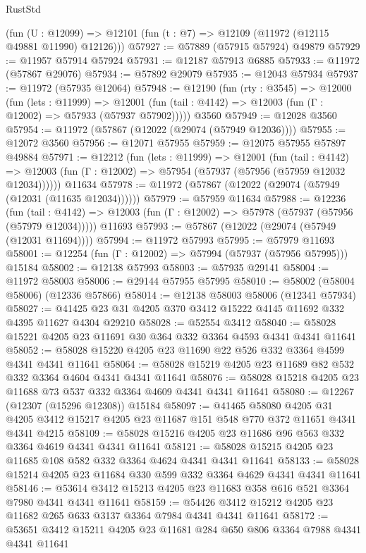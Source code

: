 \begin{lexlean}{RustStd}
\begin{coremodule}
    (fun (U : @12099) => @12101 (fun (t : @7) => @12109 (@11972 (@12115 @49881 @11990) @12126)))
@57927 := @57889 (@57915 @57924) @49879
@57929 := @11957 @57914 @57924
@57931 := @12187 @57913 @6885
@57933 := @11972 (@57867 @29076)
@57934 := @57892 @29079
@57935 := @12043 @57934
@57937 := @11972 (@57935 @12064)
@57948 := @12190
    (fun (rty : @3545) =>
    @12000
      (fun (lets : @11999) =>
      @12001 (fun (tail : @4142) => @12003 (fun (Γ : @12002) => @57933 (@57937 @57902)))))
    @3560
@57949 := @12028 @3560
@57954 := @11972 (@57867 (@12022 (@29074 (@57949 @12036))))
@57955 := @12072 @3560
@57956 := @12071 @57955
@57959 := @12075 @57955 @57897 @49884
@57971 := @12212
    (fun (lets : @11999) =>
    @12001
      (fun (tail : @4142) =>
      @12003 (fun (Γ : @12002) => @57954 (@57937 (@57956 (@57959 @12032 @12034))))))
    @11634
@57978 := @11972 (@57867 (@12022 (@29074 (@57949 (@12031 (@11635 @12034))))))
@57979 := @57959 @11634
@57988 := @12236
    (fun (tail : @4142) => @12003 (fun (Γ : @12002) => @57978 (@57937 (@57956 (@57979 @12034)))))
    @11693
@57993 := @57867 (@12022 (@29074 (@57949 (@12031 @11694))))
@57994 := @11972 @57993
@57995 := @57979 @11693
@58001 := @12254 (fun (Γ : @12002) => @57994 (@57937 (@57956 @57995))) @15184
@58002 := @12138 @57993
@58003 := @57935 @29141
@58004 := @11972 @58003
@58006 := @29144 @57955 @57995
@58010 := @58002 (@58004 @58006) (@12336 @57866)
@58014 := @12138 @58003 @58006 (@12341 @57934)
@58027 := @41425 @23 @31 @4205 @370 @3412 @15222 @4145 @11692 @332 @4395 @11627 @4304 @29210
@58028 := @52554 @3412
@58040 := @58028 @15221 @4205 @23 @11691 @30 @364 @332 @3364 @4593 @4341 @4341 @11641
@58052 := @58028 @15220 @4205 @23 @11690 @22 @526 @332 @3364 @4599 @4341 @4341 @11641
@58064 := @58028 @15219 @4205 @23 @11689 @82 @532 @332 @3364 @4604 @4341 @4341 @11641
@58076 := @58028 @15218 @4205 @23 @11688 @73 @537 @332 @3364 @4609 @4341 @4341 @11641
@58080 := @12267 (@12307 (@15296 @12308)) @15184
@58097 := @41465
    @58080
    @4205
    @31
    @4205
    @3412
    @15217
    @4205
    @23
    @11687
    @151
    @548
    @770
    @372
    @11651
    @4341
    @4341
    @4215
@58109 := @58028 @15216 @4205 @23 @11686 @96 @563 @332 @3364 @4619 @4341 @4341 @11641
@58121 := @58028 @15215 @4205 @23 @11685 @108 @582 @332 @3364 @4624 @4341 @4341 @11641
@58133 := @58028 @15214 @4205 @23 @11684 @330 @599 @332 @3364 @4629 @4341 @4341 @11641
@58146 := @53614 @3412 @15213 @4205 @23 @11683 @358 @616 @521 @3364 @7980 @4341 @4341 @11641
@58159 := @54426 @3412 @15212 @4205 @23 @11682 @265 @633 @3137 @3364 @7984 @4341 @4341 @11641
@58172 := @53651 @3412 @15211 @4205 @23 @11681 @284 @650 @806 @3364 @7988 @4341 @4341 @11641

\end{coremodule}
\end{lexlean}
